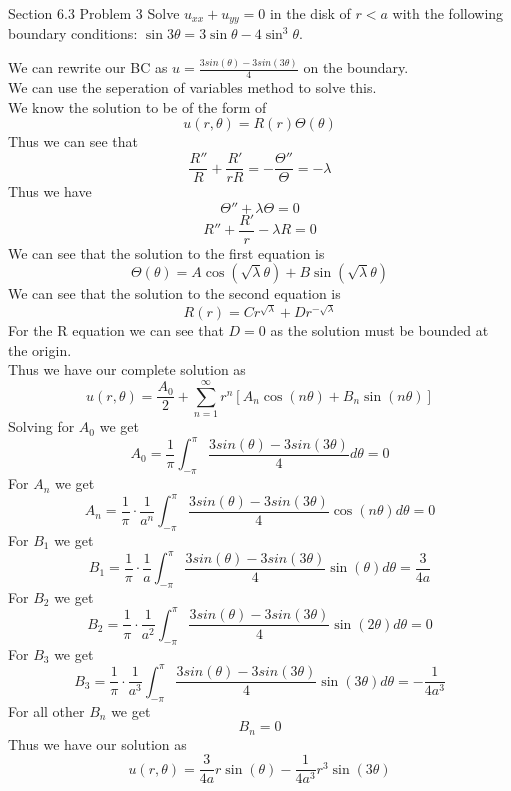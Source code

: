 \documentclass[answers,12pt,addpoints]{exam}
\begin{document}
\begin{questions}
    \question[10] Section 6.3 Problem 3
    Solve $u_{xx} + u_{yy} = 0$ in the disk of $r < a$ with the following boundary conditions:
    \(\sin 3\theta = 3 \sin \theta - 4 \sin^3 \theta\).
    \begin{solution}
        We can rewrite our BC as $ u = \frac{3sin(\theta) - 3sin(3\theta)}{4}$ on the boundary. \\
        We can use the seperation of variables method to solve this. \\
        We know the solution to be of the form of 
        $$ u(r, \theta) = R(r) \Theta(\theta)$$
        Thus we can see that
        $$ \frac{R''}{R} + \frac{R'}{rR} = -\frac{\Theta''}{\Theta} = -\lambda$$
        Thus we have
        $$ \Theta'' + \lambda \Theta = 0$$
        $$ R'' + \frac{R'}{r} - \lambda R = 0$$
        We can see that the solution to the first equation is
        $$ \Theta(\theta) = A \cos(\sqrt{\lambda} \theta) + B \sin(\sqrt{\lambda} \theta)$$
        We can see that the solution to the second equation is
        $$ R(r) = C r^{\sqrt{\lambda}} + D r^{-\sqrt{\lambda}}$$
        For the R equation we can see that $D=0$ as the solution must be bounded at the origin. \\
        Thus we have our complete solution as
        $$ u(r, \theta) = \frac{A_0}{2} + \sum_{n=1}^{\infty} r^n [A_n \cos(n\theta) + B_n \sin(n\theta)]$$
        Solving for $A_0$ we get
        $$ A_0 = \frac{1}{\pi} \int_{-\pi}^{\pi} \frac{3sin(\theta) - 3sin(3\theta)}{4} d\theta = 0$$
        For $A_n$ we get
        $$ A_n = \frac{1}{\pi} \cdot \frac{1}{a^n} \int_{-\pi}^{\pi} \frac{3sin(\theta) - 3sin(3\theta)}{4} \cos(n\theta) d\theta = 0$$
        For $B_1$ we get
        $$ B_1 = \frac{1}{\pi} \cdot \frac{1}{a} \int_{-\pi}^{\pi} \frac{3sin(\theta) - 3sin(3\theta)}{4} \sin(\theta) d\theta = \frac{3}{4a}$$
        For $B_2$ we get
        $$ B_2 = \frac{1}{\pi} \cdot \frac{1}{a^2} \int_{-\pi}^{\pi} \frac{3sin(\theta) - 3sin(3\theta)}{4} \sin(2\theta) d\theta = 0$$
        For $B_3$ we get
        $$ B_3 = \frac{1}{\pi} \cdot \frac{1}{a^3} \int_{-\pi}^{\pi} \frac{3sin(\theta) - 3sin(3\theta)}{4} \sin(3\theta) d\theta = -\frac{1}{4a^3}$$
        For all other $B_n$ we get
        $$ B_n = 0$$
        Thus we have our solution as
        $$ u(r, \theta) = \frac{3}{4a} r \sin(\theta) - \frac{1}{4a^3} r^3 \sin(3\theta)$$

        

    \end{solution}

\end{questions}
\end{document}
